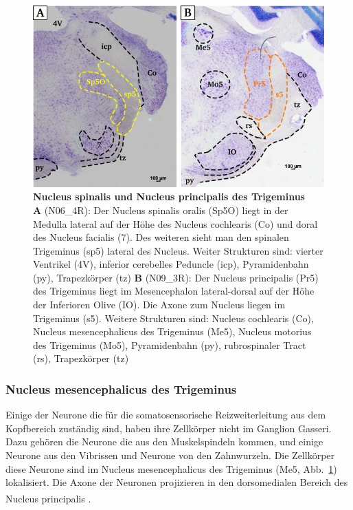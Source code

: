 \documentclass[12pt,a4paper,pdftex]{article}
\begin{document}
\begin{figure}[H]
    \centering
    \includegraphics[width = \textwidth]
    {pictures/somatosensory/somato_kopf.png}
    \caption[Nucleus spinalis und Nucleus principalis des Trigeminus]{\textbf{Nucleus spinalis und Nucleus principalis des Trigeminus}\\
     \textbf{A} (N06\_4R): Der Nucleus spinalis oralis (Sp5O) liegt in der Medulla lateral auf der Höhe des Nucleus cochlearis (Co) und doral des Nucleus facialis (7). Des weiteren sieht man den spinalen Trigeminus (sp5) lateral des Nucleus. Weiter Strukturen sind: vierter Ventrikel (4V), inferior cerebelles Peduncle (icp), Pyramidenbahn (py), Trapezkörper (tz)
     \textbf{B} (N09\_3R): Der Nucleus principalis (Pr5) des Trigeminus liegt im Mesencephalon lateral-dorsal auf der Höhe der Inferioren Olive (IO). Die Axone zum Nucleus liegen im Trigeminus (s5). Weitere Strukturen sind: Nucleus cochlearis (Co), Nucleus mesencephalicus des Trigeminus (Me5), Nucleus motorius des Trigeminus (Mo5),  Pyramidenbahn (py), rubrospinaler Tract (rs), Trapezkörper (tz)}
    \label{fig:somato_Pr5}
\end{figure}

\subsubsection*{Nucleus mesencephalicus des Trigeminus}
Einige der Neurone die für die somatosensorische Reizweiterleitung aus dem Kopfbereich zuständig sind, haben ihre Zellkörper nicht im Ganglion Gasseri. Dazu gehören die Neurone die aus den Muskelspindeln kommen, und einige Neurone aus den Vibrissen und Neurone von den Zahnwurzeln. Die Zellkörper diese Neurone sind im Nucleus mesencephalicus des Trigeminus (Me5, Abb.~\ref{fig:somato_Pr5}) lokalisiert. Die Axone der Neuronen projizieren in den dorsomedialen Bereich des Nucleus principalis  \textsuperscript{\cite[5]{heldmaier2003tierphysiologie}}.
\end{document}
